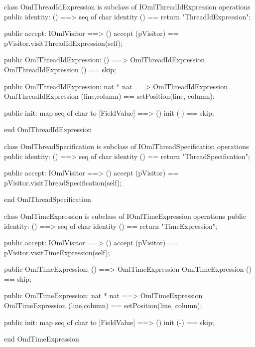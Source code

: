 \begin{vdm_al}
class OmlThreadIdExpression is subclass of IOmlThreadIdExpression
operations
  public identity: () ==> seq of char
  identity () == return "ThreadIdExpression";

  public accept: IOmlVisitor ==> ()
  accept (pVisitor) == pVisitor.visitThreadIdExpression(self);

  public OmlThreadIdExpression:
    () ==> OmlThreadIdExpression
  OmlThreadIdExpression () == 
    skip;

  public OmlThreadIdExpression:
    nat *
    nat ==> OmlThreadIdExpression
  OmlThreadIdExpression (line,column) == 
    setPosition(line, column);

  public init: map seq of char to [FieldValue] ==> ()
  init (-) == skip;

end OmlThreadIdExpression
\end{vdm_al}

\begin{vdm_al}
class OmlThreadSpecification is subclass of IOmlThreadSpecification
operations
  public identity: () ==> seq of char
  identity () == return "ThreadSpecification";

  public accept: IOmlVisitor ==> ()
  accept (pVisitor) == pVisitor.visitThreadSpecification(self);

end OmlThreadSpecification
\end{vdm_al}
\begin{vdm_al}
class OmlTimeExpression is subclass of IOmlTimeExpression
operations
  public identity: () ==> seq of char
  identity () == return "TimeExpression";

  public accept: IOmlVisitor ==> ()
  accept (pVisitor) == pVisitor.visitTimeExpression(self);

  public OmlTimeExpression:
    () ==> OmlTimeExpression
  OmlTimeExpression () == 
    skip;

  public OmlTimeExpression:
    nat *
    nat ==> OmlTimeExpression
  OmlTimeExpression (line,column) == 
    setPosition(line, column);

  public init: map seq of char to [FieldValue] ==> ()
  init (-) == skip;

end OmlTimeExpression
\end{vdm_al}

